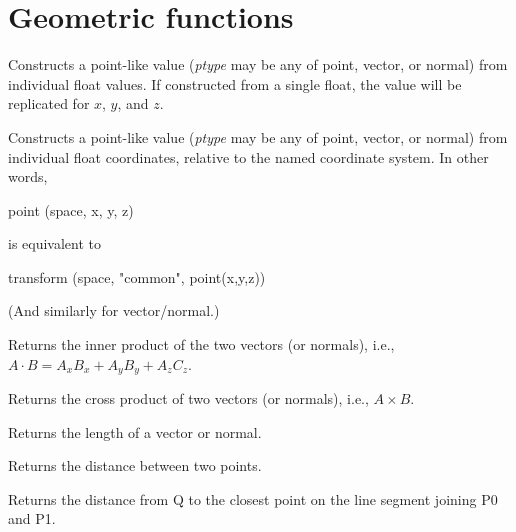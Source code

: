 \documentclass[11pt,letterpaper]{book}
\def\float{{\cf float}\xspace}
\def\normal{{\cf normal}\xspace}
\def\point{{\cf point}\xspace}
\def\vector{{\cf vector}\xspace}
\begin{document}
\section{Geometric functions}
\label{sec:stdlib:geom}


Constructs a point-like value (\emph{ptype} may be any of \point,
\vector, or \normal) from individual \float values.  If constructed
from a single \float, the value will be replicated for $x$, $y$, and $z$.

\apiend

  
Constructs a point-like value (\emph{ptype} may be any of \point,
\vector, or \normal) from individual \float coordinates, relative
to the named coordinate system.  In other words,
\begin{code}
    point (space, x, y, z)
\end{code}
\noindent is equivalent to
\begin{code}
    transform (space, "common", point(x,y,z))
\end{code}
(And similarly for \vector/\normal.)
\apiend

Returns the inner product of the two vectors (or normals), i.e., 
$A \cdot B = A_x B_x + A_y B_y + A_z C_z$.
\apiend

Returns the cross product of two vectors (or normals), i.e., 
$A \times B$.
\apiend

Returns the length of a vector or normal.
\apiend

Returns the distance between two points.
\apiend

Returns the distance from {\cf Q} to the closest point on the line
segment joining {\cf P0} and {\cf P1}.
\apiend
\end{document}
